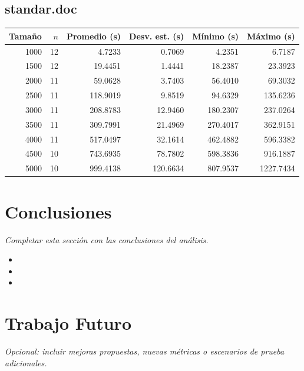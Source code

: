\documentclass[conference]{IEEEtran}
\begin{document}
\subsection{standar.doc}
\begin{center}
\begin{tabular}{rrrrrr}
\toprule
Tamaño & $n$ & Promedio (s) & Desv. est. (s) & Mínimo (s) & Máximo (s) \\
\midrule
1000 & 12 & 4.7233 & 0.7069 & 4.2351 & 6.7187 \\
1500 & 12 & 19.4451 & 1.4441 & 18.2387 & 23.3923 \\
2000 & 11 & 59.0628 & 3.7403 & 56.4010 & 69.3032 \\
2500 & 11 & 118.9019 & 9.8519 & 94.6329 & 135.6236 \\
3000 & 11 & 208.8783 & 12.9460 & 180.2307 & 237.0264 \\
3500 & 11 & 309.7991 & 21.4969 & 270.4017 & 362.9151 \\
4000 & 11 & 517.0497 & 32.1614 & 462.4882 & 596.3382 \\
4500 & 10 & 743.6935 & 78.7802 & 598.3836 & 916.1887 \\
5000 & 10 & 999.4138 & 120.6634 & 807.9537 & 1227.7434 \\
\bottomrule
\end{tabular}
\end{center}
\section{Conclusiones}
\textit{Completar esta sección con las conclusiones del análisis.}\\[0.2cm]
\begin{itemize}
\item [Conclusión 1] 
\item [Conclusión 2] 
\item [Conclusión 3] 
\end{itemize}
\section{Trabajo Futuro}
\textit{Opcional: incluir mejoras propuestas, nuevas métricas o escenarios de prueba adicionales.}
\end{document}
